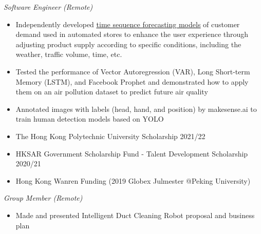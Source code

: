 \documentclass[11pt,letterpaper]{article}
\begin{document}

\cventryspace
{}

\textit{Software Engineer (Remote)}\par
\begin{itemize}
  \item Independently developed \href{https://github.com/ttezy/Time-Sequence-Analysis}{\uline{time sequence forecasting models}} of customer demand used in automated stores to enhance the user experience through adjusting product supply according to specific conditions, including the weather, traffic volume, time, etc.
  \item Tested the performance of Vector Autoregression (VAR), Long Short-term Memory (LSTM), and Facebook Prophet and demonstrated how to apply them on an air pollution dataset to predict future air quality
  \item Annotated images with labels (head, hand, and position) by makesense.ai to train human detection models based on YOLO
\end{itemize}

\begin{itemize}
  \item The Hong Kong Polytechnic University Scholarship 2021/22
  \item HKSAR Government Scholarship Fund - Talent Development Scholarship 2020/21
  \item Hong Kong Wanren Funding (2019 Globex Julmester @Peking University)
\end{itemize}

\textit{Group Member (Remote)}\par
\begin{itemize}
  \item Made and presented Intelligent Duct Cleaning Robot proposal and business plan
\end{itemize}
\end{document}
